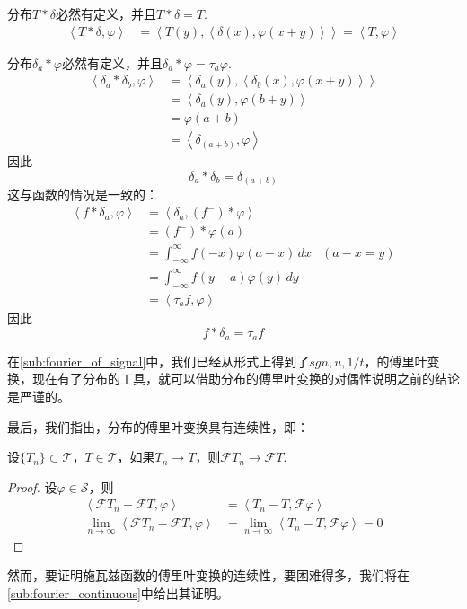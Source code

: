 \begin{example}[与$\delta$卷积]
    分布$T*\delta$必然有定义，并且$T*\delta=T$.
\begin{align*}
    \left\langle T*\delta,\varphi\right\rangle & =\left\langle T(y),\left\langle \delta(x),\varphi(x+y)\right\rangle\right\rangle=\left\langle T,\varphi\right\rangle
\end{align*}
\end{example}

\begin{example}
    分布$\delta_a*\varphi$必然有定义，并且$\delta_a*\varphi=\tau_a \varphi$.
    \begin{align*}
    \left\langle \delta_a*\delta_b,\varphi\right\rangle & =\left\langle \delta_a(y),\left\langle\delta_b(x),\varphi(x+y)\right\rangle\right\rangle \\
                                             & =\left\langle \delta_a(y),\varphi(b+y)\right\rangle                    \\
                                             & =\varphi(a+b)                                               \\
                                             & =\left\langle\delta_{(a+b)},\varphi\right\rangle
\end{align*}
因此\[\delta_a*\delta_b=\delta_{(a+b)}\]
这与函数的情况是一致的：\begin{align*}
    \left\langle f*\delta_a,\varphi\right\rangle & =\left\langle \delta_a,(f^-)*\varphi\right\rangle                  \\
                                      & =(f^-)*\varphi(a)                                       \\
                                      & =\int_{-\infty}^{\infty}f(-x)\varphi(a-x)\,dx & (a-x=y) \\
                                      & =\int_{-\infty}^{\infty}f(y-a)\varphi(y)\,dy\\
                                      &=\left\langle \tau_a f,\varphi\right\rangle
\end{align*}
因此\[f*\delta_a=\tau_a f\]
\end{example}
在\ref{sub:fourier_of_signal}中，我们已经从形式上得到了$sgn,u,1/t$，的傅里叶变换，现在有了分布的工具，就可以借助分布的傅里叶变换的对偶性说明之前的结论是严谨的。

最后，我们指出，分布的傅里叶变换具有连续性，即：
\begin{theorem}[分布的傅里叶变换的连续性]
    设$\{T_n\}\subset\mathcal{T} $，$T\in\mathcal{T} $，如果$T_n\to T$，则$\mathcal{F} T_n\to\mathcal{F} T$.
\end{theorem}
\begin{proof}
    设$\varphi\in\mathcal{S} $，则
    \begin{align*}
    \left\langle\mathcal{F} T_n-\mathcal{F} T,\varphi\right\rangle & =\left\langle T_n-T,\mathcal{F} \varphi\right\rangle \\
    \lim_{n\to\infty}\left\langle\mathcal{F} T_n-\mathcal{F} T,\varphi\right\rangle & =\lim_{n\to\infty}\left\langle T_n-T,\mathcal{F} \varphi\right\rangle=0
\end{align*}
\end{proof}

然而，要证明施瓦兹函数的傅里叶变换的连续性，要困难得多，我们将在\ref{sub:fourier_continuous}中给出其证明。
